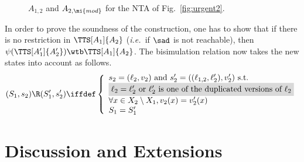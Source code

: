 \documentclass{LMCS}
\theoremstyle{plain}\newtheorem*{prop11}{Proposition~\ref{prop:states} bis}
\def\ie{{\em i.e.\ }}
\begin{document}
\begin{figure}[t]
  \caption[$A_{1,2}$ and $A_{2,\mi{mod}}$ for the NTA of Fig.~\ref{fig:urgent2}]
  {$A_{1,2}$ and $A_{2,\mi{mod}}$ for the NTA of Fig.~\ref{fig:urgent2}.}
  \label{fig:result2}
\end{figure}















In order to prove the soundness of the construction, one has to show that if
there is no restriction in $\TTS[A_1]{A_2}$ (\ie if $\sad$ is not reachable),
then $\psi(\TTS[A'_1]{A'_2})\wtb\TTS[A_1]{A_2}$. The bisimulation relation now
takes the new states into account as follows.
\[(S_1,s_2)\R(S'_1,s'_2) \iffdef\left\{
\begin{array}{l}
  s_2=(\ell_2, v_2)\text{ and }s'_2=((\ell_{1,2},\ell'_2),v'_2)\text{ s.t.}\\
  \text{\colorbox{lightgray!60}
    {$\ell_2=\ell'_2$ or $\ell'_2$ is one of the duplicated versions of $\ell_2$}}\\
  \forall x\in X_2\setminus X_1, v_2(x)=v'_2(x)\\
  S_1=S'_1\\
\end{array}
\right.\]











\section{Discussion and Extensions}\label{sec:shared_clocks_ext}
\end{document}
